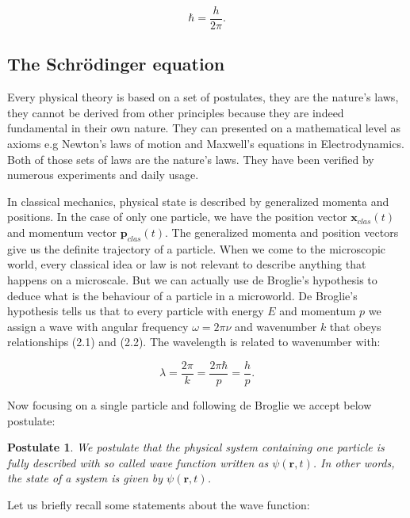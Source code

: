 \documentclass[a4paper,oneside,openright,11pt]{book}
\newtheorem{theorem}{Postulate}
\begin{document}
\begin{equation*}
    \hbar = \frac{h}{2 \pi}.
\end{equation*}

\subsection{The Schrödinger equation}

Every physical theory is based on a set of postulates, they are the nature's laws, they cannot be derived from other principles because they are indeed fundamental in their own nature. They can presented on a mathematical level as axioms e.g Newton's laws of motion and Maxwell's equations in Electrodynamics. Both of those sets of laws are the nature's laws. They have been verified by numerous experiments and daily usage.

In classical mechanics, physical state is described by generalized momenta and positions. In the case of only one particle, we have the position vector $\textbf{x}_{clas}(t)$ and momentum vector  $\textbf{p}_{clas}(t)$. The generalized momenta and position vectors give us the definite trajectory of a particle. When we come to the microscopic world, every classical idea or law is not relevant to describe anything that happens on a microscale. But we can actually use de Broglie's hypothesis to deduce what is the behaviour of a particle in a microworld. De Broglie's hypothesis tells us that to every particle with energy $E$ and momentum $p$  we assign a wave with angular frequency $\omega = 2 \pi \nu$ and wavenumber $k$ that obeys relationships (2.1) and (2.2). The wavelength is related to wavenumber with:

\begin{equation}
    \lambda = \frac{2 \pi}k = \frac{2 \pi \hbar}{p} = \frac{h}{p}.
\end{equation}

Now focusing on a single particle and following de Broglie we accept below postulate:

\begin{theorem}
We postulate that the physical system containing one particle is fully described with so called wave function written as $\psi(\textbf{r}, t)$. In other words, the state of a system is given by $\psi(\textbf{r}, t)$.
\end{theorem}

Let us briefly recall some statements about the wave function:
\end{document}
